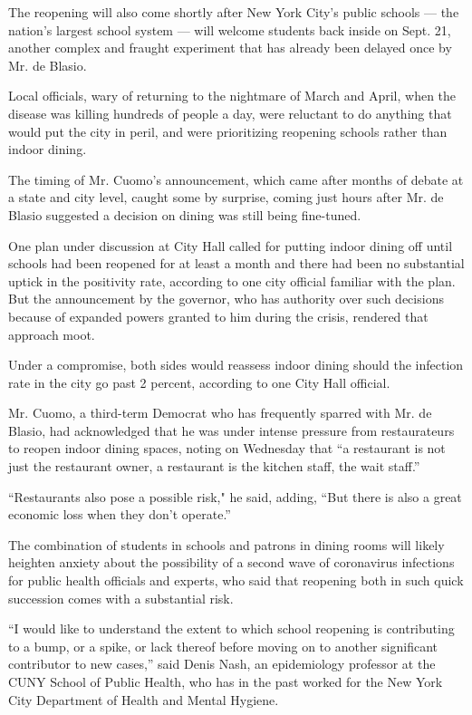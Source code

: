 The reopening will also come shortly after New York City's public
schools --- the nation's largest school system --- will welcome students
back inside on Sept. 21, another complex and fraught experiment that has
already been delayed once by Mr. de Blasio.

Local officials, wary of returning to the nightmare of March and April,
when the disease was killing hundreds of people a day, were reluctant to
do anything that would put the city in peril, and were prioritizing
reopening schools rather than indoor dining.

The timing of Mr. Cuomo's announcement, which came after months of
debate at a state and city level, caught some by surprise, coming just
hours after Mr. de Blasio suggested a decision on dining was still being
fine-tuned.

One plan under discussion at City Hall called for putting indoor dining
off until schools had been reopened for at least a month and there had
been no substantial uptick in the positivity rate, according to one city
official familiar with the plan. But the announcement by the governor,
who has authority over such decisions because of expanded powers granted
to him during the crisis, rendered that approach moot.

Under a compromise, both sides would reassess indoor dining should the
infection rate in the city go past 2 percent, according to one City Hall
official.

Mr. Cuomo, a third-term Democrat who has frequently sparred with Mr. de
Blasio, had acknowledged that he was under intense pressure from
restaurateurs to reopen indoor dining spaces, noting on Wednesday that
``a restaurant is not just the restaurant owner, a restaurant is the
kitchen staff, the wait staff.''

``Restaurants also pose a possible risk," he said, adding, ``But there
is also a great economic loss when they don't operate.''

The combination of students in schools and patrons in dining rooms will
likely heighten anxiety about the possibility of a second wave of
coronavirus infections for public health officials and experts, who said
that reopening both in such quick succession comes with a substantial
risk.

``I would like to understand the extent to which school reopening is
contributing to a bump, or a spike, or lack thereof before moving on to
another significant contributor to new cases,'' said Denis Nash, an
epidemiology professor at the CUNY School of Public Health, who has in
the past worked for the New York City Department of Health and Mental
Hygiene.

